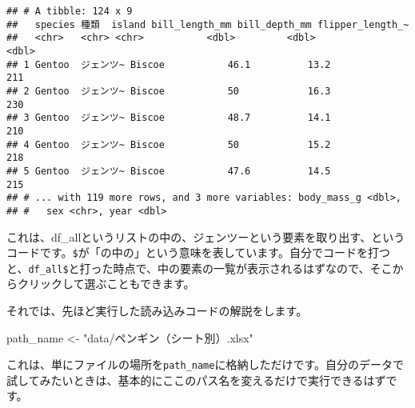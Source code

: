 \documentclass[
  xelatex,ja=standard, b5paper]{bxjsbook}
\newenvironment{Shaded}{\begin{snugshade}}{\end{snugshade}}
\newcommand{\DataTypeTok}[1]{\textcolor[rgb]{0.13,0.29,0.53}{#1}}
\newcommand{\KeywordTok}[1]{\textcolor[rgb]{0.13,0.29,0.53}{\textbf{#1}}}
\newcommand{\NormalTok}[1]{#1}
\newcommand{\OperatorTok}[1]{\textcolor[rgb]{0.81,0.36,0.00}{\textbf{#1}}}
\newcommand{\StringTok}[1]{\textcolor[rgb]{0.31,0.60,0.02}{#1}}
\begin{document}
\begin{Shaded}
\end{Shaded}

\begin{verbatim}
## # A tibble: 124 x 9
##   species 種類  island bill_length_mm bill_depth_mm flipper_length_~
##   <chr>   <chr> <chr>           <dbl>         <dbl>            <dbl>
## 1 Gentoo  ジェンツ~ Biscoe           46.1          13.2              211
## 2 Gentoo  ジェンツ~ Biscoe           50            16.3              230
## 3 Gentoo  ジェンツ~ Biscoe           48.7          14.1              210
## 4 Gentoo  ジェンツ~ Biscoe           50            15.2              218
## 5 Gentoo  ジェンツ~ Biscoe           47.6          14.5              215
## # ... with 119 more rows, and 3 more variables: body_mass_g <dbl>,
## #   sex <chr>, year <dbl>
\end{verbatim}

これは、df\_allというリストの中の、ジェンツーという要素を取り出す、というコードです。\texttt{\$}が「の中の」という意味を表しています。自分でコードを打つと、\texttt{df\_all\$}と打った時点で、中の要素の一覧が表示されるはずなので、そこからクリックして選ぶこともできます。

それでは、先ほど実行した読み込みコードの解説をします。

\begin{Shaded}
\begin{Highlighting}[]
\NormalTok{path_name <-}\StringTok{ "data/ペンギン（シート別）.xlsx"}
\end{Highlighting}
\end{Shaded}

これは、単にファイルの場所を\texttt{path\_name}に格納しただけです。自分のデータで試してみたいときは、基本的にここのパス名を変えるだけで実行できるはずです。

\begin{Shaded}
\end{Shaded}
\end{document}
